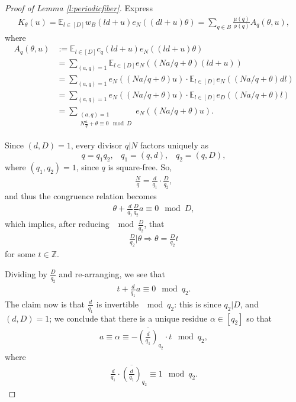 \documentclass[12pt]{amsart}
\numberwithin{equation}{section}
\theoremstyle{definition}
\begin{document}
\begin{proof}[Proof of Lemma \ref{l:periodicfiber}]
Express
    \begin{align}
    K_\theta(u) = \mathbb{E}_{l \in [D]} w_B(ld+u) e_N((dl + u)\theta)  = \sum_{q \in B} \frac{\mu(q)}{\phi(q)} A_q(\theta,u),
\end{align}
where
\begin{align}
    A_q(\theta,u) &:= \mathbb{E}_{l \in [D]} c_q(ld + u) e_N( (ld + u ) \theta) \\
    & = \sum_{(a,q) = 1} \mathbb{E}_{l \in [D]} e_N( (Na/q + \theta)(ld+u) )\\
    &= \sum_{(a,q) =1} e_N((Na/q + \theta)u) \cdot \mathbb{E}_{l \in [D]} e_N( (Na/q + \theta) dl) \\
    &= \sum_{(a,q) =1} e_N((Na/q + \theta)u) \cdot \mathbb{E}_{l \in [D]} e_D( (Na/q + \theta) l) \\
    & = \sum_{\substack{(a,q) =1 \\ N\frac{a}{q} + \theta \equiv 0 \mod D}} e_N( (Na/q + \theta) u ).
\end{align}

Since $(d,D) = 1$, every divisor $q | N$ factors uniquely as
\[ q = q_1q_2, \; \; \; q_1 = (q,d), \; \; \; q_2 = (q,D),\]
where $(q_1,q_2) = 1$, since $q$ is square-free. So,
\begin{align}
    \frac{N}{q} = \frac{d}{q_1} \cdot \frac{D}{q_2},
\end{align}
and thus the congruence relation becomes
\begin{align}
    \theta + \frac{d}{q_1} \frac{D}{q_2} a \equiv 0 \mod D,
\end{align}
which implies, after reducing $\mod \frac{D}{q_2}$, that
\begin{align}
    \frac{D}{q_2} | \theta \Rightarrow \theta = \frac{D}{q_2} t
\end{align}
for some $t \in \mathbb{Z}$.

Dividing by $\frac{D}{q_2}$ and re-arranging, we see that
\begin{align}
    t + \frac{d}{q_1} a \equiv 0 \mod q_2.
\end{align}
The claim now is that $\frac{d}{q_1}$ is invertible $\mod q_2$: this is since $q_2|D$, and $(d,D) = 1$; we conclude that there is a unique residue $\alpha \in [q_2]$ so that
\begin{align}
    a \equiv \alpha \equiv - \overline{ (\frac{d}{q_1}) }_{q_2} \cdot t \mod q_2,
\end{align}
where
\begin{align}
    \frac{d}{q_1} \cdot \overline{ (\frac{d}{q_1}) }_{q_2} \equiv 1 \mod q_2.
\end{align}


\end{proof}
\end{document}

